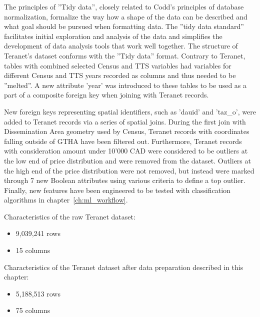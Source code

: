 The principles of ''Tidy data'', closely related to Codd's principles of database normalization, formalize the way how a shape of the data can be described and what goal should be pursued when formatting data.
The ''tidy data standard''  facilitates initial exploration and analysis of the data and simplifies the development of data analysis tools that work well together.
The structure of Teranet's dataset conforms with the ''Tidy data'' format.
Contrary to Teranet, tables with combined selected Census and TTS variables had variables for different Census and TTS years recorded as columns and thus needed to be ''melted''.
A new attribute 'year' was introduced to these tables to be used as a part of a composite foreign key when joining with Teranet records.

New foreign keys representing spatial identifiers, such as 'dauid' and 'taz\_o', were added to Teranet records via a series of spatial joins.
During the first join with Dissemination Area geometry used by Census, Teranet records with coordinates falling outside of GTHA have been filtered out.
Furthermore, Teranet records with consideration amount under 10'000 CAD were considered to be outliers at the low end of price distribution and were removed from the dataset.
Outliers at the high end of the price distribution were not removed, but instead were marked through 7 new Boolean attributes using various criteria to define a top outlier.
Finally, new features have been engineered to be tested with classification algorithms in chapter~\ref{ch:ml_workflow}.

\vspace{5mm}

Characteristics of the raw Teranet dataset:
\begin{itemize}
    \item 9,039,241 rows
    \item 15 columns
\end{itemize}

Characteristics of the Teranet dataset after data preparation described in this chapter:
\begin{itemize}
    \item 5,188,513 rows
    \item 75 columns
\end{itemize}

